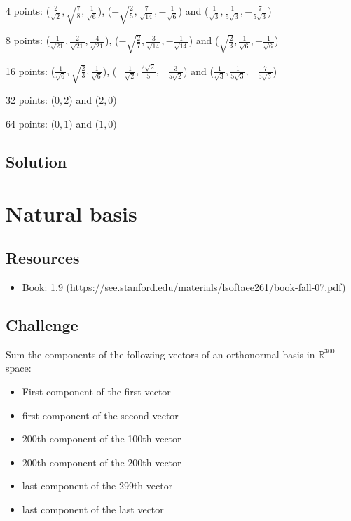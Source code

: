 4 points:
($\displaystyle \frac{2}{\sqrt{2}}, \sqrt{\frac{7}{8}}, \frac{1}{\sqrt{6}}$),
($\displaystyle -\sqrt{\frac{2}{5}}, \frac{7}{\sqrt{14}}, -\frac{1}{\sqrt{6}}$) and
($\displaystyle \frac{1}{\sqrt{3}},  \frac{1}{5 \sqrt{3}}, -\frac{7}{5 \sqrt{3}}$)

8 points:
($\displaystyle \frac{1}{\sqrt{21}}, \frac{2}{\sqrt{21}}, \frac{4}{\sqrt{21}}$),
($\displaystyle -\sqrt{\frac{2}{7}}, \frac{3}{\sqrt{14}}, -\frac{1}{\sqrt{14}}$) and
($\displaystyle \sqrt{\frac{2}{3}},  \frac{1}{\sqrt{6}}, -\frac{1}{\sqrt{6}}$)

16 points:
($\displaystyle \frac{1}{\sqrt{6}}, \sqrt{\frac{2}{3}}, \frac{1}{\sqrt{6}}$),
($\displaystyle -\frac{1}{\sqrt{2}},  \frac{2 \sqrt{2}}{5}, -\frac{3}{5 \sqrt{2}}$) and
($\displaystyle \frac{1}{\sqrt{3}},  \frac{1}{5 \sqrt{3}}, -\frac{7}{5 \sqrt{3}}$)

32 points:
($0, 2$) and ($2, 0$)

64 points:
($0, 1$) and ($1, 0$)

\subsection*{Solution}
\six{}


\timebox




\newpage
\section{Natural basis}

\subsection*{Resources}
\begin{itemize}
    \item Book: 1.9 (\url{https://see.stanford.edu/materials/lsoftaee261/book-fall-07.pdf})
\end{itemize}

\subsection*{Challenge}
Sum the components of the following vectors of an orthonormal basis in $\mathbb{R}^{300}$ space:

\begin{itemize}
    \item First component of the first vector
    \item first component of the second vector
    \item 200th component of the 100th vector
    \item 200th component of the 200th vector
    \item last component of the 299th vector
    \item last component of the last vector
\end{itemize}

